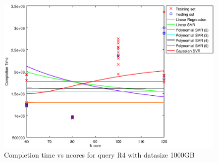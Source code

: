 
\begin {figure}[hbtp]
\centering
\includegraphics[width=\textwidth]{output/R4_1000_1_OVER_NCORES/plot_R4_1000.eps}
\caption{Completion time vs ncores for query R4 with datasize 1000GB}
\label{fig:all_nonlinear_R4_1000}
\end {figure}
